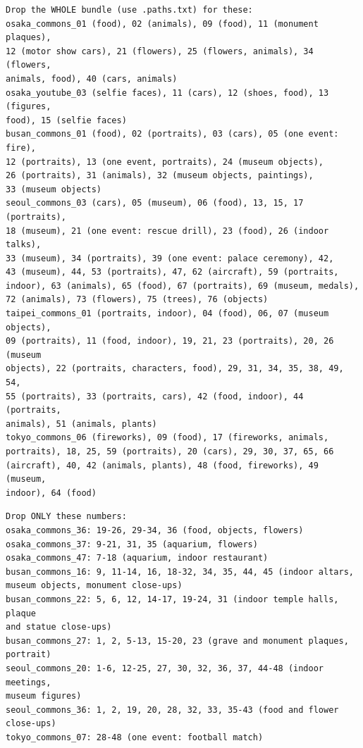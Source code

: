 \documentclass[11pt]{article}
\begin{document}
\begin{Verbatim}[fontsize=\footnotesize, breaklines, breakanywhere, frame=single, framesep=2mm]
Drop the WHOLE bundle (use .paths.txt) for these:
osaka_commons_01 (food), 02 (animals), 09 (food), 11 (monument plaques),
12 (motor show cars), 21 (flowers), 25 (flowers, animals), 34 (flowers,
animals, food), 40 (cars, animals)
osaka_youtube_03 (selfie faces), 11 (cars), 12 (shoes, food), 13 (figures,
food), 15 (selfie faces)
busan_commons_01 (food), 02 (portraits), 03 (cars), 05 (one event: fire),
12 (portraits), 13 (one event, portraits), 24 (museum objects),
26 (portraits), 31 (animals), 32 (museum objects, paintings),
33 (museum objects)
seoul_commons_03 (cars), 05 (museum), 06 (food), 13, 15, 17 (portraits),
18 (museum), 21 (one event: rescue drill), 23 (food), 26 (indoor talks),
33 (museum), 34 (portraits), 39 (one event: palace ceremony), 42,
43 (museum), 44, 53 (portraits), 47, 62 (aircraft), 59 (portraits,
indoor), 63 (animals), 65 (food), 67 (portraits), 69 (museum, medals),
72 (animals), 73 (flowers), 75 (trees), 76 (objects)
taipei_commons_01 (portraits, indoor), 04 (food), 06, 07 (museum objects),
09 (portraits), 11 (food, indoor), 19, 21, 23 (portraits), 20, 26 (museum
objects), 22 (portraits, characters, food), 29, 31, 34, 35, 38, 49, 54,
55 (portraits), 33 (portraits, cars), 42 (food, indoor), 44 (portraits,
animals), 51 (animals, plants)
tokyo_commons_06 (fireworks), 09 (food), 17 (fireworks, animals,
portraits), 18, 25, 59 (portraits), 20 (cars), 29, 30, 37, 65, 66
(aircraft), 40, 42 (animals, plants), 48 (food, fireworks), 49 (museum,
indoor), 64 (food)
\end{Verbatim}

\begin{Verbatim}[fontsize=\footnotesize, breaklines, breakanywhere, frame=single, framesep=2mm]
Drop ONLY these numbers:
osaka_commons_36: 19-26, 29-34, 36 (food, objects, flowers)
osaka_commons_37: 9-21, 31, 35 (aquarium, flowers)
osaka_commons_47: 7-18 (aquarium, indoor restaurant)
busan_commons_16: 9, 11-14, 16, 18-32, 34, 35, 44, 45 (indoor altars,
museum objects, monument close-ups)
busan_commons_22: 5, 6, 12, 14-17, 19-24, 31 (indoor temple halls, plaque
and statue close-ups)
busan_commons_27: 1, 2, 5-13, 15-20, 23 (grave and monument plaques,
portrait)
seoul_commons_20: 1-6, 12-25, 27, 30, 32, 36, 37, 44-48 (indoor meetings,
museum figures)
seoul_commons_36: 1, 2, 19, 20, 28, 32, 33, 35-43 (food and flower
close-ups)
tokyo_commons_07: 28-48 (one event: football match)
\end{Verbatim}
\end{document}
